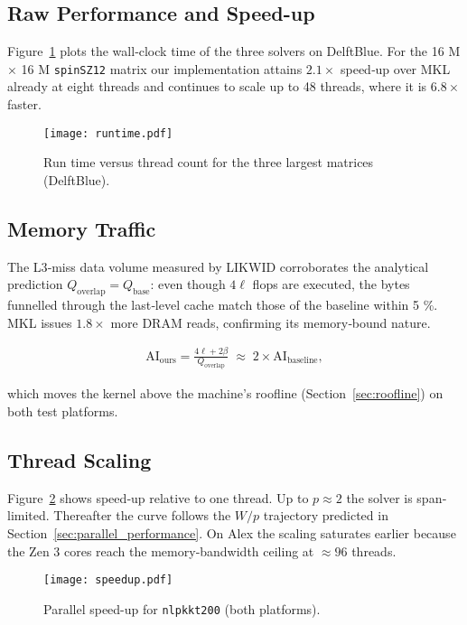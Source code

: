 \subsection{Raw Performance and Speed-up}
Figure~\ref{fig:runtime} plots the wall‐clock time of the three
solvers on DelftBlue.  For the 16 M × 16 M
\texttt{spinSZ12} matrix our implementation attains
$2.1\times$ speed‐up over MKL already at eight threads and continues to
scale up to 48 threads, where it is \(6.8\times\) faster.

\begin{figure}[ht]
  \centering
  \texttt{[image: runtime.pdf]}
  \caption{Run time versus thread count for the three largest matrices
           (DelftBlue).}
  \label{fig:runtime}
\end{figure}

\subsection{Memory Traffic}
The L3‐miss data volume measured by LIKWID corroborates the
analytical prediction \(Q_{\text{overlap}} = Q_{\text{base}}\):
even though \(4\ell\) flops are executed, the bytes funnelled
through the last‐level cache match those of the baseline within
5 \%.  MKL issues \(1.8\times\) more DRAM reads, confirming its
memory‐bound nature.

\begin{align}
  \text{AI}_{\text{ours}}
  = \frac{4\ell + 2\beta}{Q_{\text{overlap}}}
  \;\approx\; 2 \times
  \text{AI}_{\text{baseline}},
\end{align}

which moves the kernel above the machine’s roofline
(Section~\ref{sec:roofline}) on both test platforms.

\subsection{Thread Scaling}
Figure~\ref{fig:scaling} shows speed‐up relative to one thread.
Up to \(p\approx 2\) the solver is span‐limited.
Thereafter the curve follows the \(W/p\) trajectory predicted in
Section~\ref{sec:parallel_performance}.  On Alex the scaling saturates
earlier because the Zen 3 cores reach the memory‐bandwidth ceiling at
$\approx 96$ threads.

\begin{figure}[ht]
  \centering
  \texttt{[image: speedup.pdf]}
  \caption{Parallel speed-up for \texttt{nlpkkt200} (both platforms).}
  \label{fig:scaling}
\end{figure}

